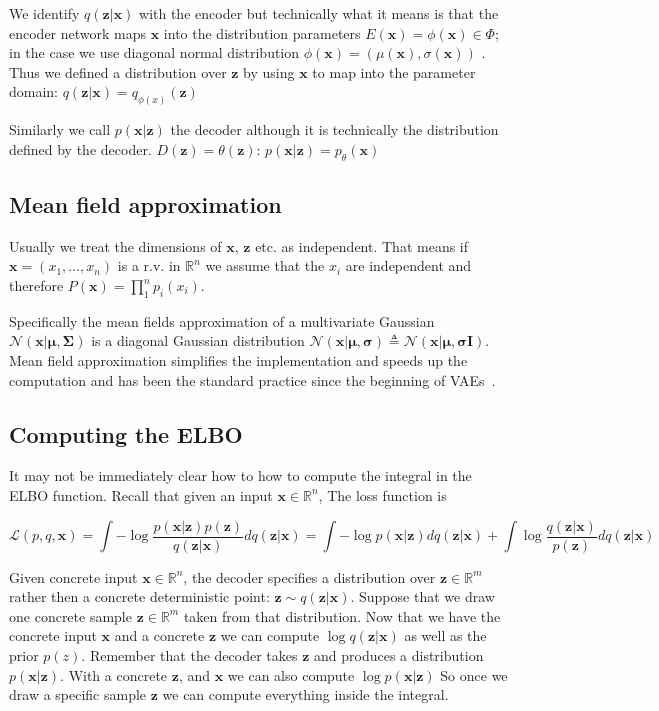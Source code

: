\documentclass[11pt, a4paper]{report}
\theoremstyle{plain}
\theoremstyle{definition}
\theoremstyle{remark}
\newcommand{\R}{\mathbb{R}}
\newcommand{\x}{\mathbf{x}}
\newcommand{\z}{\mathbf{z}}
\newcommand{\LL}{\mathcal{L}}
\newcommand{\NN}{\mathcal{N}}
\newcommand{\bv}[1]{\boldsymbol{#1}}
\begin{document}
We identify $q(\z | \x)$ with the encoder but technically what it means is that 
the encoder network maps $\x$ into the distribution parameters $E(\x) = \phi(\x)
\in \Phi$;
in the case we use diagonal normal distribution $\phi(\x) = (\mu(\x), \sigma(\x))$
. Thus we defined a distribution over $\z$ by using $\x$ to map into
the parameter domain: $q(\z | \x) = q_{\phi(x)}(\z)$

Similarly we call $p(\x | \z)$ the decoder although it is
technically the distribution defined by the decoder. $D(\z) = \theta(\z)$:
$p(\x | \z) = p_{\theta}(\x)$


\subsection{Mean field approximation}
Usually we treat the dimensions of $\x$, $\z$ etc. as independent.
That means if $\x = (x_1, \dots, x_n)$ is a r.v. in $\R^n$ 
we assume that the $x_i$ are independent and therefore 
$P(\x) = \prod_1^n p_i(x_i)$.

Specifically the mean fields approximation of a multivariate Gaussian
$\NN(\x | \bv{\mu}, \bv{\Sigma})$ is a diagonal Gaussian 
distribution 
$\NN(\x | \bv{\mu}, \bv{\sigma})
\triangleq \NN(\x | \bv{\mu}, \bv{\sigma}\bv{I})$.
Mean field approximation simplifies the implementation and speeds up the
computation and has been the standard practice since the
beginning of VAEs~\cite{kingma2013auto}.


\subsection{Computing the ELBO}
It may not be immediately clear how to how to compute the integral in the ELBO function. 
Recall that given an input $\x \in \R^n$,
The loss function is 

\begin{equation}
\LL(p,q,\x) = 
\int - \log \frac{p(\x|\z)p(\z)}{q(\z|\x)}dq(\z|\x)
= \int -\log p(\x|\z)dq(\z|\x) + \int \log \frac{q(\z|\x)}{p(\z)}dq(\z|\x)
\label{eq:elbovae}
\end{equation}

Given concrete input $\x \in \R^n$,
the decoder specifies a distribution over
$\z \in \R^m$ rather then a concrete deterministic point:
$\z \sim q(\z | \x)$. Suppose that we draw one concrete sample $\z \in \R^m$
taken from that distribution. Now that we have the concrete input $\x$ and a 
concrete $\z$ we can compute $\log q (\z | \x)$ as well as the prior $p(z)$.
Remember that the decoder takes $\z$ and produces a distribution $p(\x | \z)$.
With a concrete $\z$, and $\x$ we can also compute $\log p(\x | \z)$
So once we draw a specific sample $\z$ we can compute everything inside the
integral.
\end{document}

